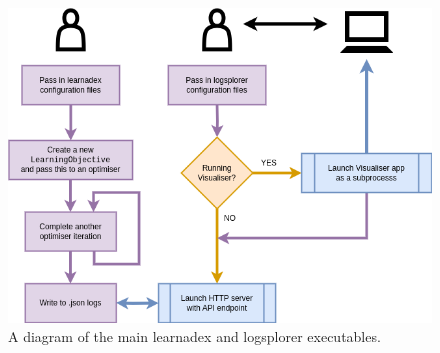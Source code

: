 \begin{figure}[h]
\centering
\includegraphics[width=13cm]{images/chapter-4-learnadex-main.drawio.png}
\caption{A diagram of the main learnadex and logsplorer executables.}
\label{fig:learnadex-main}
\end{figure}
    